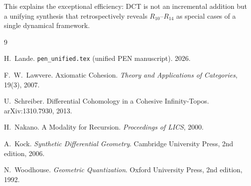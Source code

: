 \documentclass[11pt,a4paper]{article}
\theoremstyle{plain}
\theoremstyle{definition}
\theoremstyle{remark}
\begin{document}
This explains the exceptional efficiency: DCT is not an incremental addition but a unifying synthesis that retrospectively reveals $R_{10}$--$R_{14}$ as special cases of a single dynamical framework.

\begin{thebibliography}{9}

H.~Lande.
\texttt{pen_unified.tex} (unified PEN manuscript).
2026.

F.~W.~Lawvere.
Axiomatic Cohesion.
\textit{Theory and Applications of Categories}, 19(3), 2007.

U.~Schreiber.
Differential Cohomology in a Cohesive Infinity-Topos.
arXiv:1310.7930, 2013.

H.~Nakano.
A Modality for Recursion.
\textit{Proceedings of LICS}, 2000.

A.~Kock.
\textit{Synthetic Differential Geometry}.
Cambridge University Press, 2nd edition, 2006.

N.~Woodhouse.
\textit{Geometric Quantization}.
Oxford University Press, 2nd edition, 1992.

\end{thebibliography}
\end{document}
